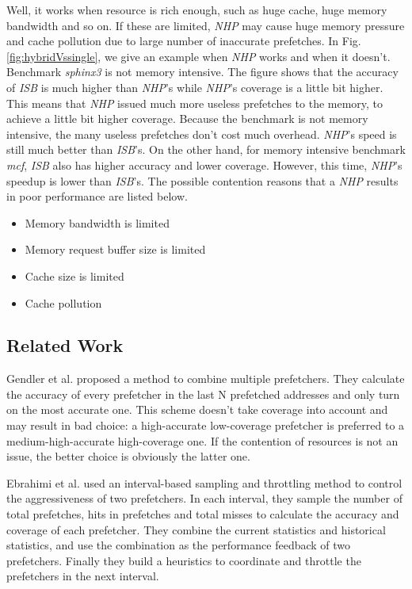   Well, it works when resource is rich enough, such as huge cache, huge memory bandwidth and so on. If these are limited, \emph{NHP} may cause huge memory pressure and cache pollution due to large number of inaccurate prefetches. In Fig. \ref{fig:hybridVssingle}, we give an example when \emph{NHP} works and when it doesn't. 
 Benchmark \emph{sphinx3} is not memory intensive. The figure shows that the accuracy of \emph{ISB} is much higher than \emph{NHP}'s while \emph{NHP}'s coverage is a little bit higher. This means that \emph{NHP} issued much more useless prefetches to the memory, to achieve a little bit higher coverage. Because the benchmark is not memory intensive, the many useless prefetches don't cost much overhead. \emph{NHP}'s speed is still much better than \emph{ISB}'s. 
 On the other hand, for memory intensive benchmark \emph{mcf}, \emph{ISB} also has higher accuracy and lower coverage. However, this time, \emph{NHP}'s speedup is lower than \emph{ISB}'s. The possible contention reasons that a \emph{NHP} results in poor performance are listed below.


  \begin{itemize}
    \item Memory bandwidth is limited
    \item Memory request buffer size is limited
    \item Cache size is limited
    \item Cache pollution
  \end{itemize}

  \subsection{Related Work}
  \label{sec:PrevSol}
  Gendler et al.\cite{gendlerpaper} proposed a method to combine multiple prefetchers.
  They calculate the accuracy of every prefetcher in the last N prefetched addresses and only turn on the most accurate one.
  This scheme doesn't take coverage into account and may result in bad choice: a high-accurate low-coverage prefetcher is preferred to a medium-high-accurate high-coverage one.
  If the contention of resources is not an issue, the better choice is obviously the latter one. \par
  Ebrahimi et al.\cite{yalepaper} used an interval-based sampling and throttling method to control the aggressiveness of two prefetchers.
  In each interval, they sample the number of total prefetches, hits in prefetches and total misses to calculate the accuracy and coverage of each prefetcher.
  They combine the current statistics and historical statistics, and use the combination as the performance feedback of two prefetchers.
  Finally they build a heuristics to coordinate and throttle the prefetchers in the next interval.



